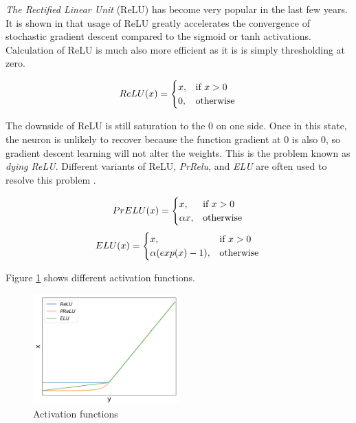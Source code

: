 \documentclass[times, utf8, diplomski, numeric, english]{fer}
\begin{document}
\textit{The Rectified Linear Unit }(ReLU) has become very popular in the last few years. It is shown in \cite{NIPS2012_4824} that usage of ReLU greatly accelerates the convergence of stochastic gradient descent compared to the sigmoid or tanh activations. Calculation of ReLU is much also more efficient as it is is simply thresholding at zero. 

\begin{equation}
ReLU(x) =
\begin{cases}
x, & \text{if}\ x>0 \\
0, & \text{otherwise}
\end{cases} \\
\end{equation}


The downside of ReLU is still saturation to the 0 on one side. Once in this state, the neuron is unlikely to recover because the function gradient at 0 is also 0, so gradient descent learning will not alter the weights. This is the problem known as \textit{dying ReLU}.
Different variants of ReLU, \textit{PrRelu}, and \textit{ELU} are often used to resolve this problem \cite{prelu}\cite{elu}.  

\begin{equation}    
PrELU(x)=
\begin{cases}
x, & \text{if}\ x>0 \\
\alpha x, & \text{otherwise}
\end{cases}\\
\end{equation}
\begin{equation}
ELU(x)=
\begin{cases}
x, & \text{if}\ x>0 \\
\alpha (exp(x) - 1), & \text{otherwise}
\end{cases}    \\
\end{equation}

Figure \ref{fg:activations} shows different activation functions.
\begin{figure}[!htb]
	\begin{center}
		\includegraphics[width=0.5\textwidth]{./imgs/activations.png}
		\caption{Activation functions}
		\label{fg:activations}
	\end{center}
\end{figure}
\end{document}
